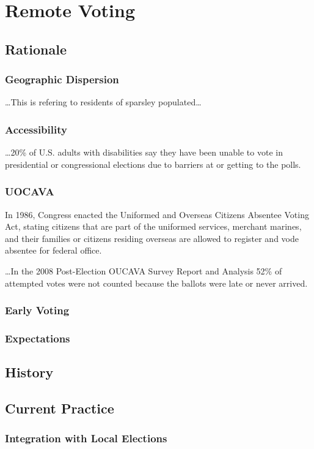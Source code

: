 \chapter{Remote Voting}
\label{chapter:remote_voting}

\section{Rationale}
\subsection{Geographic Dispersion}
\ldots This is refering to residents of sparsley populated\ldots
\subsection{Accessibility}
\ldots 20\% of U.S. adults with disabilities say they have been unable to vote in presidential or congressional elections due to barriers at or getting to the polls.
\subsection{UOCAVA}
In 1986, Congress enacted the Uniformed and Overseas Citizens Absentee Voting Act, stating citizens that are part of the uniformed services, merchant marines, and their families or citizens residing overseas are allowed to register and vode absentee for federal office. 

\ldots In the 2008 Post-Election OUCAVA Survey Report and Analysis 52\% of attempted votes were not counted because the ballots were late or never arrived.
\subsection{Early Voting}
\subsection{Expectations}
\section{History}
\section{Current Practice}
\subsection{Integration with Local Elections}

